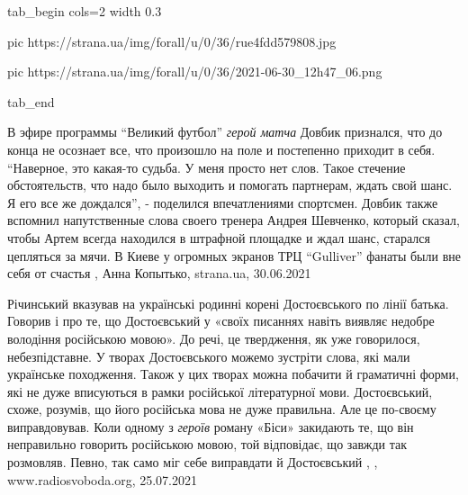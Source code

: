 
\ifcmt
  tab_begin cols=2
	width 0.3

     pic https://strana.ua/img/forall/u/0/36/rue4fdd579808.jpg

     pic https://strana.ua/img/forall/u/0/36/2021-06-30_12h47_06.png

  tab_end
\fi

В эфире программы \enquote{Великий футбол} \emph{герой матча} Довбик признался, что до
конца не осознает все, что произошло на поле и постепенно приходит в себя. 
\enquote{Наверное, это какая-то судьба. У меня просто нет слов. Такое стечение
обстоятельств, что надо было выходить и помогать партнерам, ждать свой шанс. Я
его все же дождался}, - поделился впечатлениями спортсмен.  Довбик также
вспомнил напутственные слова своего тренера Андрея Шевченко, который сказал,
чтобы Артем всегда находился в штрафной площадке и ждал шанс, старался
цепляться за мячи.  В Киеве у огромных экранов ТРЦ \enquote{Gulliver} фанаты были вне
себя от счастья
, 
Анна Копытько, strana.ua, 30.06.2021

Річинський вказував на українські родинні корені Достоєвського по лінії батька.
Говорив і про те, що Достоєвський у «своїх писаннях навіть виявляє недобре
володіння російською мовою». До речі, це твердження, як уже говорилося,
небезпідставне. У творах Достоєвського можемо зустріти слова, які мали
українське походження. Також у цих творах можна побачити й граматичні форми,
які не дуже вписуються в рамки російської літературної мови. Достоєвський,
схоже, розумів, що його російська мова не дуже правильна. Але це по-своєму
виправдовував. Коли одному з \emph{героїв} роману «Біси» закидають те, що він
неправильно говорить російською мовою, той відповідає, що завжди так розмовляв.
Певно, так само міг себе виправдати й Достоєвський
, 
, www.radiosvoboda.org, 25.07.2021

